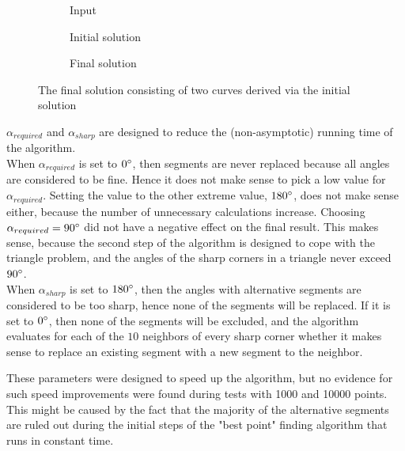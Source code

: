 \documentclass[11pt]{article}
\begin{document}
\begingroup
{}%
\begin{figure}[ht!]
\centering
\begin{subfigure}{.33\linewidth}
\centering

\caption{Input}
\label{fig:exp:multiple_split_triangles:initial:input}
\end{subfigure}%
\begin{subfigure}{.33\linewidth}
\centering

\caption{Initial solution}
\label{fig:exp:multiple_split_triangles:initial}
\end{subfigure}%
\begin{subfigure}{.33\linewidth}
\centering

\caption{Final solution}
\label{fig:exp:multiple_split_triangles:output}
\end{subfigure}
\caption{The final solution consisting of two curves derived via the initial solution}
\label{fig:exp:multiple_split_triangles}
\end{figure}
\endgroup

$\alpha_{required}$ and $\alpha_{sharp}$ are designed to reduce the (non-asymptotic) running time of the algorithm.\\
When $\alpha_{required}$ is set to $0\degree$, then segments are never replaced because all angles are considered to be fine. Hence it does not make sense to pick a low value for $\alpha_{required}$. Setting the value to the other extreme value, $180\degree$, does not make sense either, because the number of unnecessary calculations increase. Choosing $\alpha_{required} = 90\degree$ did not have a negative effect on the final result. This makes sense, because the second step of the algorithm is designed to cope with the triangle problem, and the angles of the sharp corners in a triangle never exceed $90\degree$.\\
When $\alpha_{sharp}$ is set to $180\degree$, then the angles with alternative segments are considered to be too sharp, hence none of the segments will be replaced. If it is set to $0\degree$, then none of the segments will be excluded, and the algorithm evaluates for each of the $10$ neighbors of every sharp corner whether it makes sense to replace an existing segment with a new segment to the neighbor.

These parameters were designed to speed up the algorithm, but no evidence for such speed improvements were found during tests with 1000 and 10000 points. This might be caused by the fact that the majority of the alternative segments are ruled out during the initial steps of the "best point" finding algorithm that runs in constant time.
\end{document}
